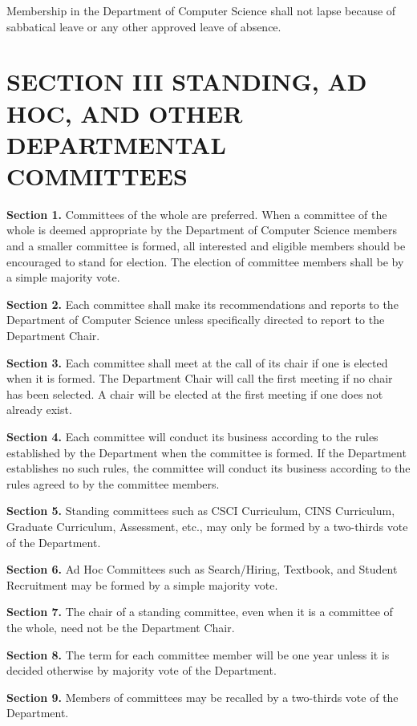 \documentclass{scrartcl}
\begin{document}
Membership in the Department of Computer Science shall not lapse because of sabbatical leave or any other approved leave of absence.

\section*{SECTION III STANDING, AD HOC, AND OTHER DEPARTMENTAL COMMITTEES}
{}


\textbf{Section 1.} Committees of the whole are preferred. When a committee of the whole is deemed appropriate by the Department of Computer Science members and a smaller committee is formed, all interested and eligible members should be encouraged to stand for election. The election of committee members shall be by a simple majority vote.

\textbf{Section 2.} Each committee shall make its recommendations and reports to the Department of Computer Science unless specifically directed to report to the Department Chair.

\textbf{Section 3.} Each committee shall meet at the call of its chair if one is elected when it is formed. The Department Chair will call the first meeting if no chair has been selected. A chair will be elected at the first meeting if one does not already exist.

\textbf{Section 4.} Each committee will conduct its business according to the rules established by the Department when the committee is formed. If the Department establishes no such rules, the committee will conduct its business according to the rules agreed to by the committee members.

\textbf{Section 5.} Standing committees such as CSCI Curriculum, CINS Curriculum, Graduate Curriculum, Assessment, etc., may only be formed by a two-thirds vote of the Department.

\textbf{Section 6.} Ad Hoc Committees such as Search/Hiring, Textbook, and Student Recruitment may be formed by a simple majority vote.

\textbf{Section 7.} The chair of a standing committee, even when it is a committee of the whole, need not be the Department Chair.

\textbf{Section 8.} The term for each committee member will be one year unless it is decided otherwise by majority vote of the Department.

\textbf{Section 9.} Members of committees may be recalled by a two-thirds vote of the Department.
\end{document}
